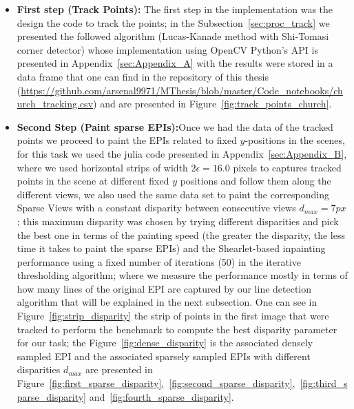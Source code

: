 \bigskip

\begin{itemize}

\item \textbf{First step (Track Points):} The first step in the implementation was the design the code to track the points; in the Subsection~\ref{sec:proc_track} we presented the followed algorithm (Lucas-Kanade method with Shi-Tomasi corner detector) whose implementation using OpenCV Python's API is presented in Appendix~\ref{sec:Appendix_A} with the results were stored in a data frame that one can find in the repository of this thesis (\url{https://github.com/arsenal9971/MThesis/blob/master/Code_notebooks/church_tracking.csv}) and are presented in Figure~\ref{fig:track_points_church}.

\bigskip

\item \textbf{Second Step (Paint sparse EPIs):}Once we had the data of the tracked points we proceed to paint the EPIs related to fixed $y$-positions in the scenes, for this task we used the julia code presented in Appendix~\ref{sec:Appendix_B}, where we used horizontal strips of width $2\epsilon=16.0$ pixels to captures tracked points in the scene at different fixed $y$ positions and follow them along the different views, we also used the same data set to paint the corresponding Sparse Views with a constant disparity between consecutive views $d_{max}=7px$; this maximum disparity was chosen by trying different disparities and pick the best one in terms of the painting speed (the greater the disparity, the less time it takes to paint the sparse EPIs) and the Shearlet-based inpainting performance using a fixed number of iterations (50) in the iterative thresholding algorithm; where we measure the performance mostly in terms of how many lines of the original EPI are captured by our line detection algorithm that will be explained in the next subsection. One can see in Figure~\ref{fig:strip_disparity} the strip of points in the first image that were tracked to perform the benchmark to compute the best disparity parameter for our task; the Figure~\ref{fig:dense_disparity} is the associated densely sampled EPI and the associated sparsely sampled EPIs with different disparities $d_{max}$ are presented in Figure~\ref{fig:first_sparse_disparity},~\ref{fig:second_sparse_disparity},~\ref{fig:third_sparse_disparity} and~\ref{fig:fourth_sparse_disparity}. 

\bigskip


\end{itemize}
